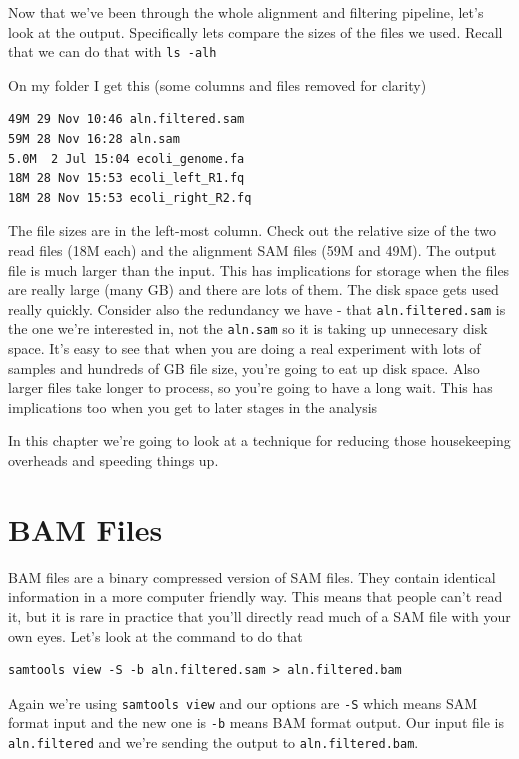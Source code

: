 \documentclass[]{book}
\begin{document}
Now that we've been through the whole alignment and filtering pipeline, let's look at the output. Specifically lets compare the sizes of the files we used. Recall that we can do that with \texttt{ls\ -alh}

On my folder I get this (some columns and files removed for clarity)

\begin{verbatim}
49M 29 Nov 10:46 aln.filtered.sam
59M 28 Nov 16:28 aln.sam
5.0M  2 Jul 15:04 ecoli_genome.fa
18M 28 Nov 15:53 ecoli_left_R1.fq
18M 28 Nov 15:53 ecoli_right_R2.fq
\end{verbatim}

The file sizes are in the left-most column. Check out the relative size of the two read files (18M each) and the alignment SAM files (59M and 49M). The output file is much larger than the input. This has implications for storage when the files are really large (many GB) and there are lots of them. The disk space gets used really quickly. Consider also the redundancy we have - that \texttt{aln.filtered.sam} is the one we're interested in, not the \texttt{aln.sam} so it is taking up unnecesary disk space. It's easy to see that when you are doing a real experiment with lots of samples and hundreds of GB file size, you're going to eat up disk space. Also larger files take longer to process, so you're going to have a long wait. This has implications too when you get to later stages in the analysis

In this chapter we're going to look at a technique for reducing those housekeeping overheads and speeding things up.

\hypertarget{bam-files}{%
\section{BAM Files}\label{bam-files}}

BAM files are a binary compressed version of SAM files. They contain identical information in a more computer friendly way. This means that people can't read it, but it is rare in practice that you'll directly read much of a SAM file with your own eyes. Let's look at the command to do that

\begin{verbatim}
samtools view -S -b aln.filtered.sam > aln.filtered.bam
\end{verbatim}

Again we're using \texttt{samtools\ view} and our options are \texttt{-S} which means SAM format input and the new one is \texttt{-b} means BAM format output. Our input file is \texttt{aln.filtered} and we're sending the output to \texttt{aln.filtered.bam}.
\end{document}
